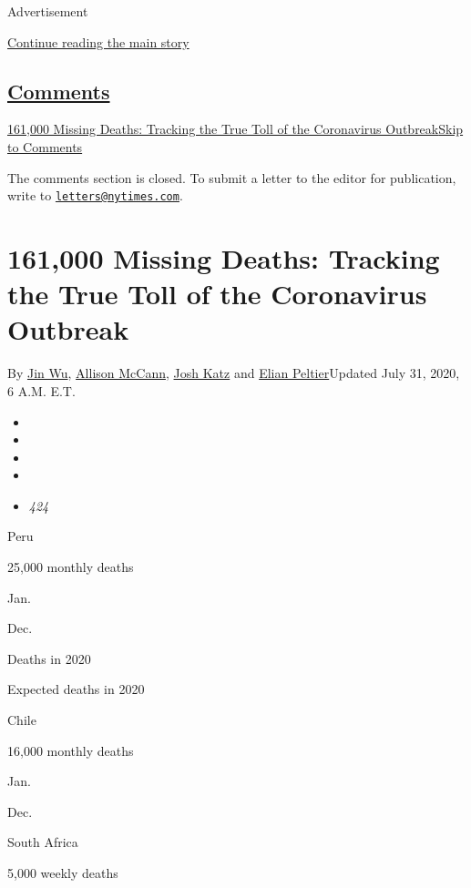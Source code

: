 Advertisement

\protect\hyperlink{after-top}{Continue reading the main story}

\hypertarget{comments}{%
\subsection{\texorpdfstring{\protect\hyperlink{commentsContainer}{Comments}}{Comments}}\label{comments}}

\href{}{161,000 Missing Deaths: Tracking the True Toll of the
Coronavirus Outbreak}\href{}{Skip to Comments}

The comments section is closed. To submit a letter to the editor for
publication, write to
\href{mailto:letters@nytimes.com}{\nolinkurl{letters@nytimes.com}}.

\hypertarget{161000-missing-deaths-tracking-the-true-toll-of-the-coronavirus-outbreak}{%
\section{161,000 Missing Deaths: Tracking the True Toll of the
Coronavirus
Outbreak}\label{161000-missing-deaths-tracking-the-true-toll-of-the-coronavirus-outbreak}}

By \href{https://www.nytimes.com/by/jin-wu}{Jin Wu},
\href{https://www.nytimes.com/by/allison-mccann}{Allison McCann},
\href{https://www.nytimes.com/by/josh-katz}{Josh Katz} and
\href{https://www.nytimes.com/by/elian-peltier}{Elian Peltier}Updated
July 31, 2020, 6 A.M. E.T.

\begin{itemize}
\item
\item
\item
\item
\item
  \emph{424}
\end{itemize}

Peru

25,000 monthly deaths

Jan.

Dec.

Deaths in 2020

Expected deaths in 2020

Chile

16,000 monthly deaths

Jan.

Dec.

South Africa

5,000 weekly deaths

